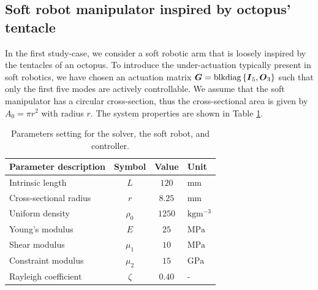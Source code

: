 \subsection{Soft robot manipulator inspired by octopus' tentacle}
In the first study-case, we consider a soft robotic arm that is loosely inspired by the tentacles of an octopus. To introduce the under-actuation typically present in soft robotics, we have chosen an actuation matrix $\boldsymbol{G} = \textnormal{blkdiag}\left\{ {\boldsymbol{I}_5, \boldsymbol{O}_3} \right\}$ such that only the first five modes are actively controllable.  We assume that the soft manipulator has a circular cross-section, thus the cross-sectional area is given by $A_0 = \pi r^2$ with radius $r$. The system properties are shown in Table \ref{tab:C3:parameters1}.
%
\renewcommand\arraystretch{1.15}
\begin{table}[t]
  \vspace{-0.25cm}
  \caption{Parameters setting for the solver, the soft robot, and controller.}\label{tab:C3:parameters1} \centering
  \begin{tabular}{l|ccl}
    \hline
    Parameter description & Symbol & Value & Unit \\
    \hline 
    \hline
    Intrinsic length & $L $ & $ 120$ & mm \\
    Cross-sectional radius & $r $ & $ 8.25$ & $\text{mm}$ \\
    Uniform density & $\rho_0 $ & $ 1250$ & $\text{kg}\text{m}^{-3}$ \\
    Young's modulus & $E $ & $ 25$ & $\text{MPa}$ \\
    Shear modulus & $\mu_1 $ & $ 10 $ & $\text{MPa}$ \\
    Constraint modulus & $\mu_2 $ & $ 15 $ & $\text{GPa}$ \\
    Rayleigh coefficient & $\zeta $ & $ 0.40 $ & - \\
    \hline
  \end{tabular}
  \end{table}
%
